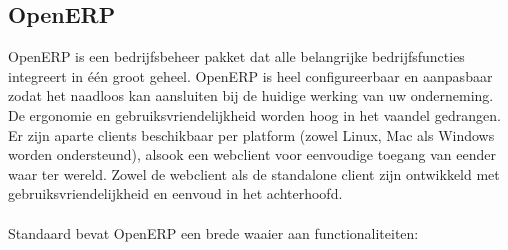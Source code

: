 \subsection{OpenERP}
OpenERP is een bedrijfsbeheer pakket dat alle belangrijke bedrijfsfuncties integreert in \'e\'en groot geheel. OpenERP is heel configureerbaar en aanpasbaar zodat het naadloos kan aansluiten bij de huidige werking van uw onderneming. De ergonomie en gebruiksvriendelijkheid worden hoog in het vaandel gedrangen. Er zijn aparte clients beschikbaar per platform (zowel Linux, Mac als Windows worden ondersteund), alsook een webclient voor eenvoudige toegang van eender waar ter wereld. Zowel de webclient als de standalone client zijn ontwikkeld met gebruiksvriendelijkheid en eenvoud in het achterhoofd.\\\\
%
Standaard bevat OpenERP een brede waaier aan functionaliteiten:
